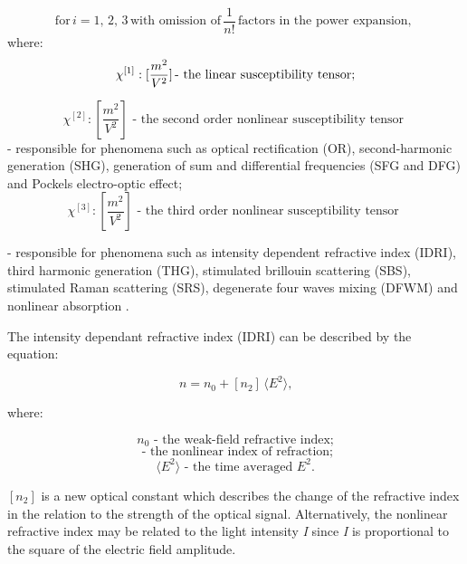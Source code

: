 \documentclass[12pt,twoside,a4paper]{article}
\numberwithin{equation}{subsection}
\numberwithin{figure}{subsection}
\begin{document}
\begin{equation*}
  \mbox{for}\,i=1, \,2, \,3\,\mbox{with omission of}\,\frac {1}{n\mathrm{!}}\, \mbox{factors in the power expansion, }
\end{equation*}
where: 
\begin{equation*}
  \chi ^{[1]} : [\frac {m^{2}}{V^{2}}]
  \mbox{\,- the linear susceptibility tensor;}
\end{equation*}

\begin{equation*}
  \chi ^{[2]} : [\frac {m^{2}}{V^{2}}]
  \mbox{ - the second order nonlinear susceptibility tensor  }
\end{equation*}
- responsible for phenomena such as optical rectification (OR), second-harmonic generation (SHG), generation of sum and
differential frequencies (SFG and DFG) and Pockels electro-optic effect;
\begin{equation*}
  \chi ^{[3]} : [\frac {m^{2}}{V^{2}}]
  \mbox{ - the third order nonlinear susceptibility tensor  }
\end{equation*}

- responsible for phenomena such as intensity dependent refractive index (IDRI), third harmonic generation (THG), stimulated
brillouin scattering (SBS), stimulated Raman scattering (SRS), degenerate four waves mixing (DFWM)
and nonlinear absorption \cite{samoc_nlo_opt_mat}. 

The intensity dependant refractive index (IDRI) can be described by the equation:

\begin{equation} \label{eq:refr_idri}
  n={n_{0}} + [{n_{2}}]\,\langle E^{2}\rangle \mbox{,}
\end{equation}

where: 

\begin{equation*}
  {n_{0}} \mbox{ - the weak-field refractive index;}
\end{equation*}
\begin{equation*}
  [{n_{2}}] \mbox{ - the nonlinear index of refraction;}
\end{equation*}
\begin{equation*}
  \langle E^{2}\rangle \mbox{ - the time averaged $E^2$.}
\end{equation*}

$[n_2]$ is a new optical constant which describes the change of the refractive index in the relation to the strength of
the optical signal. Alternatively, the nonlinear refractive index may be related to the light intensity \textit{I} since \textit{I} is
proportional to the square of the electric field amplitude.
\end{document}
